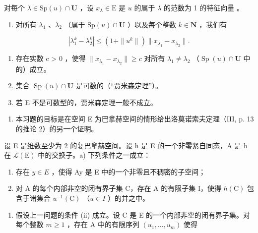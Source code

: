 对每个 \(\lambda\in\mathrm{Sp}(u)\cap\mathbf{U}\) ，设 \(x_{\lambda}\in\mathrm{E}\) 是 \(u\) 的属于 \(\lambda\) 的范数为 1 的特征向量 。

\begin{enumerate}
\def\labelenumi{\alph{enumi})}
\tightlist
\item
  对所有 \(\lambda_1\) 、\(\lambda_2\) （属于 \(\mathrm{Sp}(u) \cap \mathbf{U}\) ）以及每个整数 \(k \in \mathbf{N}\) ，我们有
\end{enumerate}

\[
\left| \lambda_ {1} ^ {k} - \lambda_ {2} ^ {k} \right| \leqslant \left(1 + \| u ^ {k} \|\right) \| x _ {\lambda_ {1}} - x _ {\lambda_ {2}} \|.
\]

\begin{enumerate}
\def\labelenumi{\alph{enumi})}
\setcounter{enumi}{1}
\item
  存在实数 c \textgreater{} 0 ，使得 \(\|x_{\lambda_{1}} - x_{\lambda_{2}}\| \geqslant c\) 对所有 \(\lambda_{1} \neq \lambda_{2}\) （\(\operatorname{Sp}(u) \cap \mathbf{U}\) 中的）成立。
\item
  集合 \(\operatorname{Sp}(u) \cap \mathbf{U}\) 是可数的（“贾米森定理”）。
\item
  若 E 不是可数型的，贾米森定理一般不成立。
\end{enumerate}

\begin{enumerate}
\def\labelenumi{\arabic{enumi})}
\setcounter{enumi}{4}
\tightlist
\item
  本习题的目标是在空间 E 为巴拿赫空间的情形给出洛莫诺索夫定理（III, p. 13 的推论 2）的另一个证明。
\end{enumerate}

设 E 是维数至少为 2 的复巴拿赫空间。设 h 是 E 的一个非零紧自同态，A 是 h 在 \(\mathcal{L}(\mathrm{E})\) 中的交换子。a) 下列条件之一成立：

\begin{enumerate}
\def\labelenumi{(\roman{enumi})}
\item
  存在 \(y \in E\) ，使得 Ay 是 E 中的一个非零且不稠密的子空间；
\item
  对 A 的每个内部非空的闭有界子集 C，存在 A 的有限子集 I，使得 \(h(\mathrm{C})\) 包含于诸集合 \(u^{-1}(\mathrm{C})\) （\(u \in I\) ）的并之中。
\end{enumerate}

\begin{enumerate}
\def\labelenumi{\alph{enumi})}
\setcounter{enumi}{1}
\tightlist
\item
  假设上一问题的条件 (ii) 成立。设 C 是 E 的一个内部非空的闭有界子集。对每个整数 \(m \geqslant 1\) ，存在 A 中的有限序列 \((u_{1}, \ldots, u_{m})\) 使得
\end{enumerate}

